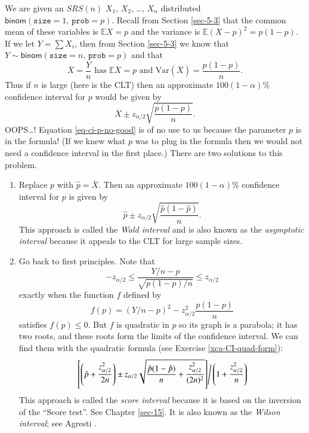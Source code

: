 \documentclass[captions=tableheading]{scrbook}
\begin{document}
We are given an \(SRS(n)\) \(X_{1}\), \(X_{2}\), \ldots{}, \(X_{n}\) distributed \(\mathsf{binom}(\mathtt{size}=1,\,\mathtt{prob}=p)\). Recall from Section \ref{sec-5-3} that the common mean of these variables is \(\mathbb{E} X=p\) and the variance is \(\mathbb{E}(X-p)^{2}=p(1-p)\). If we let \(Y=\sum X_{i}\), then from Section \ref{sec-5-3} we know that \(Y\sim\mathsf{binom}(\mathtt{size}=n,\,\mathtt{prob}=p)\) and that 
\[
\overline{X}=\frac{Y}{n}\mbox{ has }\mathbb{E}\overline{X}=p\mbox{ and }\mathrm{Var}(\overline{X})=\frac{p(1-p)}{n}.
\]
Thus if \(n\) is large (here is the CLT) then an approximate \(100(1-\alpha)\%\) confidence interval for \(p\) would be given by
\begin{equation}
\overline{X}\pm z_{\alpha/2}\sqrt{\frac{p(1-p)}{n}}.\label{eq-ci-p-no-good}
\end{equation}
OOPS\ldots{}! Equation \ref{eq-ci-p-no-good} is of no use to us because the  parameter \(p\) is in the formula! (If we knew what \(p\) was to plug in the formula then we would not need a confidence interval in the first place.) There are two solutions to this problem.
\begin{enumerate}
\item Replace \(p\) with \(\hat{p}=\overline{X}\). Then an approximate \(100(1-\alpha)\%\) confidence interval for \(p\) is given by 
   \begin{equation}
   \hat{p}\pm z_{\alpha/2}\sqrt{\frac{\hat{p}(1-\hat{p})}{n}}.
   \end{equation}
   This approach is called the \emph{Wald interval} and is also known as the \emph{asymptotic interval} because it appeals to the CLT for large sample sizes.
\item Go back to first principles. Note that
   \[
   -z_{\alpha/2}\leq\frac{Y/n-p}{\sqrt{p(1-p)/n}}\leq z_{\alpha/2}
   \]
   exactly when the function \(f\) defined by
   \[
   f(p)=\left(Y/n-p\right)^{2}-z_{\alpha/2}^{2}\frac{p(1-p)}{n}
   \]
   satisfies \(f(p)\leq0\). But \(f\) is quadratic in \(p\) so its graph is a parabola; it has two roots, and these roots form the limits of the confidence interval. We can find them with the quadratic formula (see Exercise \ref{xca-CI-quad-form}):
   \begin{equation}
   \left.\left[\left(\hat{p}+\frac{z_{\alpha/2}^{2}}{2n}\right)\pm z_{\alpha/2}\sqrt{\frac{\hat{p}(1-\hat{p})}{n}+\frac{z_{\alpha/2}^{2}}{(2n)^{2}}}\right]\right/ \left(1+\frac{z_{\alpha/2}^{2}}{n}\right)
   \end{equation}
   This approach is called the \emph{score interval} because it is based on the inversion of the ``Score test''. See Chapter \ref{sec-15}. It is also known as the \emph{Wilson interval}; see Agresti \cite{Agresti2002}.
\end{enumerate}
\end{document}
